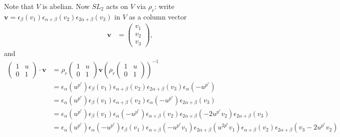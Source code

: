 																																	Note that $V$ is abelian. Now $SL_2$ acts on $V$ via $\rho_r$: write $\mathbf{v} = \epsilon_ \beta (v_1)\epsilon_{\alpha+\beta}(v_2) \epsilon_{2\alpha+\beta}(v_3)$ in $V$ as a column vector
																																	\begin{align*}
																																	\mathbf{v} &= \left(\begin{matrix} v_1 \\ v_2 \\ v_3 \end{matrix}\right),
																																	\end{align*}
																																	and
																																	\begin{align*}
																																	\left(\begin{matrix} 1 & u \\ 0 & 1\end{matrix}\right) \cdot \mathbf{v} 
																																	&= 
																																	\rho_r\left(\begin{matrix} 1 & u \\ 0 & 1\end{matrix}\right) \mathbf{v}\left( \rho_r\left(\begin{matrix} 1 & u \\ 0 & 1\end{matrix}\right)\right)^{-1} \\
																																		&=
																																		\epsilon_ \alpha (u^{p^r}) \epsilon_ \beta (v_1)\epsilon_{\alpha+\beta}(v_2) \epsilon_{2\alpha+\beta}(v_3) \epsilon_ \alpha (-u^{p^r}) \\
																																			&=
																																			\epsilon_ \alpha (u^{p^r}) \epsilon_ \beta (v_1) \epsilon_{\alpha+\beta}(v_2) \epsilon_ \alpha (-u^{p^r}) \epsilon_{2\alpha+\beta}(v_3) \\
																																				&=
																																				\epsilon_ \alpha (u^{p^r}) \epsilon_ \beta (v_1)  \epsilon_ \alpha (-u^{p^r}) \epsilon_{\alpha+\beta}(v_2) \epsilon_{2\alpha+\beta}(-2u^{p^r}v_2)\epsilon_{2\alpha+\beta}(v_3)\\
																																					&=
																																					\epsilon_ \alpha (u^{p^r}) \epsilon_ \alpha (-u^{p^r})  \epsilon_ \beta (v_1) \epsilon_{\alpha+\beta}(-u^{p^r}v_1) \epsilon_{2\alpha+\beta}(u^{2p^r}v_1) \epsilon_{\alpha+\beta}(v_2) \epsilon_{2\alpha+\beta}(v_3-2u^{p^r}v_2)\\

\end{align*}
